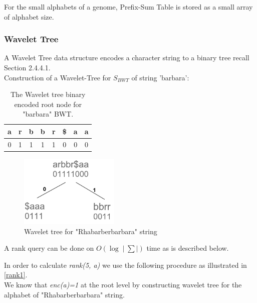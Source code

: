 \documentclass[11pt,a4paper]{report}
\begin{document}
For the small alphabets of a genome, Prefix-Sum Table is stored
as a small array of alphabet size.

\subsubsection{Wavelet Tree}
A Wavelet Tree data structure encodes a character string to a
binary tree recall Section 2.4.4.1.\\

Construction of a Wavelet-Tree for $ S_{BWT} $ of string 'barbara':

 
\begin{table}[h]
\centering
  \begin{tabular}{ c c c c c c c c}
   a  & r & b & b & r & \$ & a & a \\ 
  \hline
   0 &	1 &	1 & 1 & 1 & 0 & 0 & 0\\  
  \hline
  \end{tabular}
\caption{The Wavelet tree binary encoded root node for "barbara" BWT.}
\label{wavlet-binary-barbara}
\end{table}


\begin{figure}[H]
\centering
\includegraphics[width=4.75cm]{pictures/WavletBarbara.png}
\caption{Wavelet tree for "Rhabarberbarbara" string }
\label{Wavlet-barbara}
\end{figure}


A rank query can be done on  $O(\log{}\mid\sum\mid)$ time as is described below.

In order to calculate \emph{rank(5, a)} we use the following procedure
as illustrated in \ref{rank1}.\\
We know that \emph{enc(a)=1} at the root level by constructing wavelet
tree for the alphabet of  "Rhabarberbarbara" string.
\end{document}
